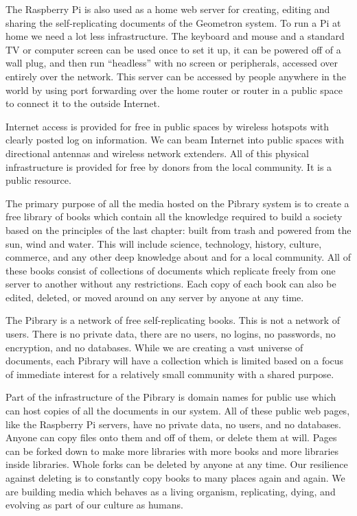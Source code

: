 The Raspberry Pi is also used as a home web server for creating, editing
and sharing the self-replicating documents of the Geometron system. To
run a Pi at home we need a lot less infrastructure. The keyboard and
mouse and a standard TV or computer screen can be used once to set it
up, it can be powered off of a wall plug, and then run ``headless'' with
no screen or peripherals, accessed over entirely over the network. This
server can be accessed by people anywhere in the world by using port
forwarding over the home router or router in a public space to connect
it to the outside Internet.

Internet access is provided for free in public spaces by wireless
hotspots with clearly posted log on information. We can beam Internet
into public spaces with directional antennas and wireless network
extenders. All of this physical infrastructure is provided for free by
donors from the local community. It is a public resource.

The primary purpose of all the media hosted on the Pibrary system is to
create a free library of books which contain all the knowledge required
to build a society based on the principles of the last chapter: built
from trash and powered from the sun, wind and water. This will include
science, technology, history, culture, commerce, and any other deep
knowledge about and for a local community. All of these books consist of
collections of documents which replicate freely from one server to
another without any restrictions. Each copy of each book can also be
edited, deleted, or moved around on any server by anyone at any time.

The Pibrary is a network of free self-replicating books. This is not a
network of users. There is no private data, there are no users, no
logins, no passwords, no encryption, and no databases. While we are
creating a vast universe of documents, each Pibrary will have a
collection which is limited based on a focus of immediate interest for a
relatively small community with a shared purpose.

Part of the infrastructure of the Pibrary is domain names for public use
which can host copies of all the documents in our system. All of these
public web pages, like the Raspberry Pi servers, have no private data,
no users, and no databases. Anyone can copy files onto them and off of
them, or delete them at will. Pages can be forked down to make more
libraries with more books and more libraries inside libraries. Whole
forks can be deleted by anyone at any time. Our resilience against
deleting is to constantly copy books to many places again and again. We
are building media which behaves as a living organism, replicating,
dying, and evolving as part of our culture as humans.

